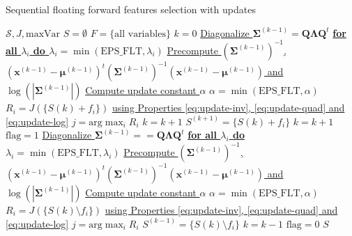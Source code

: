 \documentclass[a4paper,11pt,DIV=16,abstracton]{scrartcl}
\begin{document}
        \begin{algorithm}
        \caption{Sequential floating forward features selection with updates\label{alg:sffs-update}}
        {\fontsize{8}{8}\selectfont
        \begin{algorithmic}[1]
        \REQUIRE $\mathcal{S},J,\text{maxVar}$
        \STATE $S=\emptyset$
        \STATE $F=\text{\{all variables\}}$
        \STATE $k=0$
        \STATE \underline{Diagonalize $\boldsymbol{\Sigma}^{(k-1)} = \mathbf{Q} \boldsymbol{\Lambda} \mathbf{Q}^t$}
        \STATE \underline{\bfseries{for all} $\lambda_i$ \bfseries{do} $\lambda_i = \min (\text{EPS\_FLT},\lambda_i)$}
        \STATE \underline{Precompute $(\boldsymbol{\Sigma}^{(k-1)})^{-1}$, $(\mathbf{x}^{(k-1)} - \boldsymbol{\mu}^{(k-1)})^t (\boldsymbol{\Sigma}^{(k-1)})^{-1} (\mathbf{x}^{(k-1)} - \boldsymbol{\mu}^{(k-1)})$ and $\log \left(|\boldsymbol{\Sigma}^{(k-1)}|\right)$}
        \STATE \underline{Compute update constant $\alpha$}
        \STATE \underline{$\alpha = \min (\text{EPS\_FLT},\alpha)$}
        \STATE $R_i = J(\{S{(k)} + f_i\})$ \underline{using Properties \ref{eq:update-inv}, \ref{eq:update-quad} and \ref{eq:update-log}}
        \ENDFOR
        \STATE $j=\text{arg} \max_{i} R_i$
        \STATE $k=k+1$
        \ELSE
        \STATE $S^{(k+1)} = \{S{(k)} + f_i\}$
        \STATE $k=k+1$
        \STATE $\text{flag}=1$
        \STATE \underline{Diagonalize $\boldsymbol{\Sigma}^{(k-1)} = = \mathbf{Q} \boldsymbol{\Lambda} \mathbf{Q}^t$}
        \STATE \underline{\bfseries{for all} $\lambda_i$ \bfseries{do} $\lambda_i = \min (\text{EPS\_FLT},\lambda_i)$}
        \STATE \underline{Precompute $(\boldsymbol{\Sigma}^{(k-1)})^{-1}$, $(\mathbf{x}^{(k-1)} - \boldsymbol{\mu}^{(k-1)})^t (\boldsymbol{\Sigma}^{(k-1)})^{-1} (\mathbf{x}^{(k-1)} - \boldsymbol{\mu}^{(k-1)})$ and $\log \left(|\boldsymbol{\Sigma}^{(k-1)}|\right)$}
        \STATE \underline{Compute update constant $\alpha$}
        \STATE \underline{$\alpha = \min (\text{EPS\_FLT},\alpha)$}
        \STATE $R_i = J(\{S{(k)}\setminus f_i\})$ \underline{using Properties \ref{eq:update-inv}, \ref{eq:update-quad} and \ref{eq:update-log}}
        \ENDFOR
        \STATE $j=\text{arg} \max_{i} R_i$
        \STATE $S^{(k-1)} = \{S{(k)} \setminus f_i\}$
        \STATE $k=k-1$
        \ELSE
        \STATE $\text{flag}=0$
        \ENDIF
        \ENDWHILE
        \ENDIF
        \ENDWHILE
        \RETURN $S$
        \end{algorithmic}
        }
        \end{algorithm}
\end{document}

